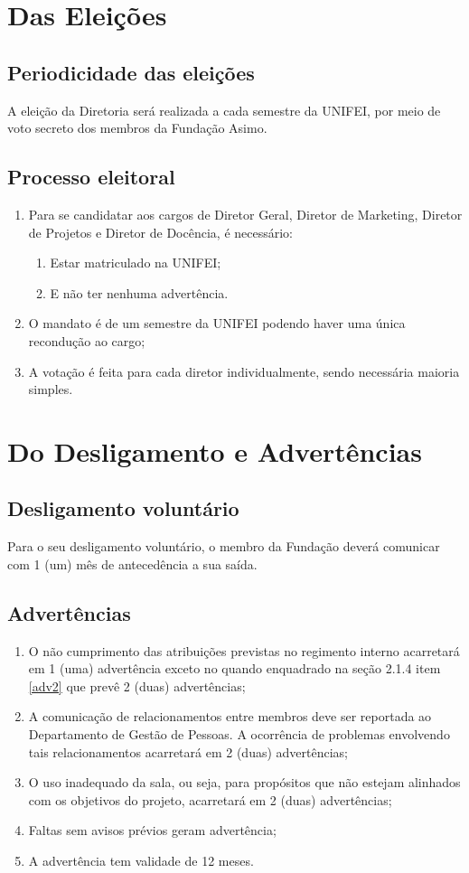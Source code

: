 \section{Das Eleições}
    \subsection{Periodicidade das eleições}
    A eleição da Diretoria será realizada a cada semestre da UNIFEI, por meio de voto secreto dos membros da Fundação Asimo.
    \subsection{Processo eleitoral}
    \begin{enumerate}
        \item Para se candidatar aos cargos de Diretor Geral, Diretor de Marketing, Diretor de Projetos e Diretor de Docência, é necessário:
        \begin{enumerate}
            \item Estar matriculado na UNIFEI;
            \item E não ter nenhuma advertência.
        \end{enumerate}
        \item O mandato é de um semestre da UNIFEI podendo haver uma única recondução ao cargo;
        \item A votação é feita para cada diretor individualmente, sendo necessária maioria simples.
    \end{enumerate}

\section{Do Desligamento e Advertências}
    \subsection{Desligamento voluntário}
        Para o seu desligamento voluntário, o membro da Fundação deverá comunicar com 1 (um) mês de antecedência a sua saída.
    \subsection{Advertências}
    \begin{enumerate}
        \item O não cumprimento das atribuições previstas no regimento interno acarretará em 1 (uma) advertência exceto no quando enquadrado na seção 2.1.4 item \ref{adv2} que prevê 2 (duas) advertências;
        \item A comunicação de relacionamentos entre membros deve ser reportada ao Departamento de Gestão de Pessoas. A ocorrência de problemas envolvendo tais relacionamentos acarretará em 2 (duas) advertências;
        \item O uso inadequado da sala, ou seja, para propósitos que não estejam alinhados com os objetivos do projeto, acarretará em 2 (duas) advertências;
        \item Faltas sem avisos prévios geram advertência;
        \item A advertência tem validade de 12 meses.
    \end{enumerate}
